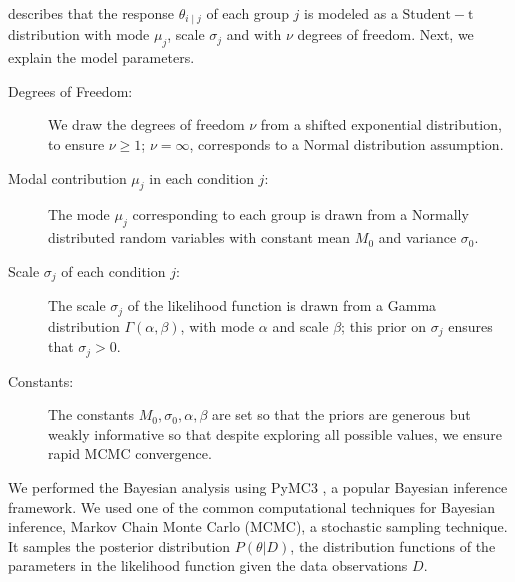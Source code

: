  describes that the response $\theta_{i \mid j}$ of each group $j$ is modeled as a $\mathrm{Student-t}$ distribution with mode $\mu_j$,  scale $\sigma_j$ and with $\nu$ degrees of freedom. Next, we explain the model parameters.


\begin{description}
    \item[Degrees of Freedom:] We draw the degrees of freedom $\nu$ from a shifted exponential distribution, to ensure $\nu \geq 1$; $\nu=\infty$, corresponds to a Normal distribution assumption.
    \item[Modal contribution $\mu_j$ in each condition $j$:] The mode $\mu_j$ corresponding to each group is drawn from a Normally distributed random variables with constant mean $M_0$ and variance $\sigma_0$. 
    \item[Scale $\sigma_j$ of each condition $j$:]  The scale $\sigma_j$ of the likelihood function is drawn from a Gamma distribution $\Gamma(\alpha, \beta)$, with mode $\alpha$ and scale $\beta$; this prior on $\sigma_j$ ensures that $\sigma_j > 0$. 
    \item[Constants:] The constants $M_0, \sigma_0, \alpha, \beta$ are set so that the priors are generous but weakly informative so that despite exploring all possible values, we ensure rapid MCMC convergence.
\end{description}

We performed the Bayesian analysis using PyMC3 \cite{salvatier2016probabilistic}, 
a popular Bayesian inference framework. We used one of the common computational techniques for Bayesian inference, Markov Chain Monte Carlo (MCMC), a stochastic sampling technique. It samples the posterior distribution $P(\theta | D)$, the distribution functions of the parameters in the likelihood function given the data observations $D$. 




